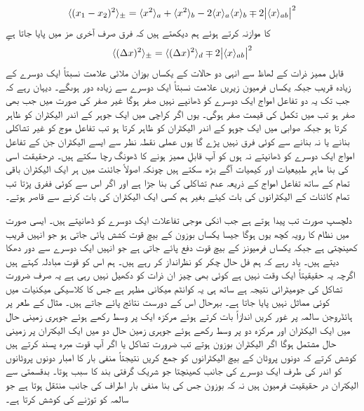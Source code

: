 \begin{align}
	\langle(x_1-x_2)^2\rangle_{\pm}=\langle x^2\rangle_a+\langle x^2 \rangle_b-2\langle x \rangle_a\langle x \rangle_b\mp2\abs{\langle x \rangle_{ab}}^2
\end{align}
 کا موازنہ کرتے ہوئے ہم دیکھتے ہیں کہ فرق صرف آخری ھز میں پایا جاتا ہےٍ
\begin{align}
	\langle(\Delta x)^2\rangle_{\pm}=\langle(\Delta x)^2\rangle_d\mp2\abs{\langle x \rangle_{ab}}^2
\end{align}
قابل ممیز ذرات کے لھاظ سے انہی دو حالات کے یکساں بوزان ملائی علامت نسبتاً ایک دوسرے کے زیادہ قریب جبکہ یکساں فرمیون زیریں علامت نسبتاً ایک دوسرے سے زیادہ دور ہوںگے۔ دیہان رہے کہ جب تک یہ دو تفاعل امواج ایک دوسرے کو ڈھانپے نہیں  صفر ہوگا غیر صفر  کی صورت میں جب بھی  صفر ہو تب  میں تکمل کی قیمت صفر ہوگی۔ یوں اگر کراچی میں ایک جوہر کے اندر الیکٹران کو  ظاہر کرتا ہو جبکہ صوابی میں ایک جوہو کے اندر الیکٹران کو  ظاہر کرتا ہو تب تفاعل موج کو غیر تشاکلی بنانے یا نہ بنانے سے کوئی فرق نہیں پڑے گا یوں عملی نقطہ نظر سے ایسے الیکٹران جن کے تفاعل امواج ایک دوسرے کو ڈھانپتے نہ ہوں کو آپ قابلِ ممیز ہونے کا ڈھونگ رچا سکتے ہیں۔ درحقیقت اسی کی بنا ماہرِ طبیعیات اور کیمیات آگے بڑھ سکتے ہیں چونکہ اصولاً جائنت میں ہر ایک الیکٹران باقی تمام کے ساتھ تفاعل امواج کے ذریعہ عدم تشاکلی کی بنا جڑا ہے اور اگر اس سے کوئی ففرق پڑتا تب تمام کائنات کے الیکٹرانوں کی بات کیئے بغیر ہم کسی ایک الیکٹران کی بات کرنے سے قاصر ہوتے۔

دلچسپ صورت تب پیدا ہوتے ہے جب انکی موجی تفاعلات ایک دوسرے کو ڈھانپتے ہیں۔ ایسی صورت میں نظام کا رویہ کچھ یوں ہوگا جیسا یکساں بوزون کے بیچ قوت کشش پائی جاتی ہو جو انہیں قریب کھینچتی ہے جبکہ یکساں فرمیونز کے بیچ قوت دفع پائے جاتی ہے جو انہیں ایک دوسرے سے دور دھکا دیتے ہیں۔ یاد رہے کہ ہم فل حال چکر کو نظرانداز کر رہے ہیں۔ ہم اس کو قوت مبادلہ کہتے ہیں اگرچہ یہ حقیقیتاً ایک وقت نہیں ہے کوئی بھی چیز ان ذرات کو دکھیل نہیں رہی ہے یہ صرف ضرورت تشاکل کی جومیٹرائی نتیجہ ہے ساتھ ہی یہ کوانٹم میکانی مظہر ہے جس کا کلاسیکی میکنیات میں کوئی مماثل نہیں پایا جاتا ہے۔ بہرحال اس کے دورست نتائج پائے جاتے ہیں۔ مثال کے طعر پر ہائڈروجن سالمہ  پر غور کریں اندازاً بات کرتے ہوئے مرکزہ ایک پر وسط رکھے ہوئے جوہری زمینی حال  میں ایک الیکٹران اور مرکزہ دو پر وسط رکھے ہوئے جوہری زمین حال دو میں ایک الیکتران پر زمینی حال مشتمل ہوگا اگر الیکٹران بوزون ہوتے تب ضرورت تشاکل یا اگر آپ قوت مبرہ پسند کرتے ہیں کوشش کرتے کہ دونوں پروٹان کے بیچ الیکٹرانوں کو جمع کریں  نتیجتاً منفی بار کا امبار دونوں پروٹانوں کو اندر کی طرف ایک دوسرے کی جانب کھینچتا جو شریک گرفتی بند کا سبب ہوتا۔ بدقسمتی سے  الیکتران در حقیقیت فرمیون ہیں نہ کہ بوزون جس کی بنا منفی بار اطراف کی جانب منتقل ہوتا ہے  جو سالمہ کو توڑنے کی کوشش کرتا ہے۔

